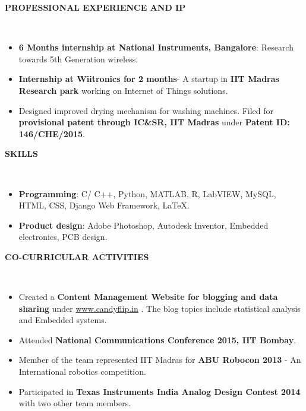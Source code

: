 \documentclass[a4paper,10pt]{article}
\newcommand{\lsep}{-0.5cm}
\newcommand{\resheading}[1]{{\small \colorbox{mygrey}{\begin{minipage}{0.975\textwidth}{\textbf{#1 \vphantom{p\^{E}}}}\end{minipage}}}}
\begin{document}
\resheading{\textbf{PROFESSIONAL EXPERIENCE AND IP} }\\[\lsep]
    \begin{itemize}
        \vspace{3pt}
        \item \textbf{6 Months internship at National Instruments, Bangalore}: Research towards 5th Generation wireless.\vspace{-5pt}        
        \item \textbf{Internship at Wiitronics for 2 months}- A startup in \textbf{IIT Madras Research park} working on Internet of Things solutions.\vspace{-5pt}        
        \item Designed improved drying mechanism for washing machines. Filed for \textbf{provisional patent through IC\&SR, IIT Madras} under \textbf{Patent ID: 146/CHE/2015}.
    \end{itemize}
    
\resheading{\textbf{SKILLS} }\\[\lsep]
    \begin{itemize}
        \vspace{3pt}
        \item \textbf{Programming}: C/ C++, Python, MATLAB, R, LabVIEW, MySQL, HTML, CSS, Django Web Framework, \LaTeX.\vspace{-5pt}
        \item \textbf{Product design}: Adobe Photoshop, Autodesk Inventor, Embedded electronics, PCB design.
    \end{itemize}

\resheading{\textbf{CO-CURRICULAR ACTIVITIES} }\\[\lsep]
    \begin{itemize}
        \item Created a \textbf{Content Management Website for blogging and data sharing} under \hspace{3pt}\url{www.candyflip.in} . The blog topics include statistical analysis and Embedded systems.
        \vspace{-5pt}
        \item Attended \textbf{National Communications Conference 2015, IIT Bombay}.
        \vspace{-5pt}
        \item Member of the team represented IIT Madras for \textbf{ABU Robocon 2013} - An International robotics competition.
        \vspace{-5pt}
        \item Participated in \textbf{Texas Instruments India Analog Design Contest 2014} with two other team members.
    \end{itemize}
\end{document}
